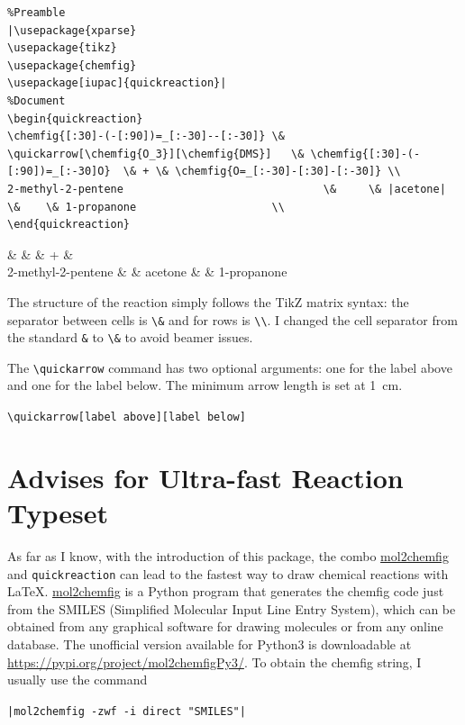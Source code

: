 \documentclass{scrarticle}
\begin{document}
\begin{lstlisting}
%Preamble
|\usepackage{xparse}
\usepackage{tikz}
\usepackage{chemfig}
\usepackage[iupac]{quickreaction}|
%Document
\begin{quickreaction}
\chemfig{[:30]-(-[:90])=_[:-30]--[:-30]} \&  \quickarrow[\chemfig{O_3}][\chemfig{DMS}]   \& \chemfig{[:30]-(-[:90])=_[:-30]O}  \& + \& \chemfig{O=_[:-30]-[:30]-[:-30]} \\
2-methyl-2-pentene                               \&     \& |acetone|                                       \&    \& 1-propanone                     \\
\end{quickreaction}
\end{lstlisting}

\begin{center}
\begin{quickreaction}
 \&     \&   \& + \&  \\
2-methyl-2-pentene                               \&     \& acetone                                      \&    \& 1-propanone                     \\
\end{quickreaction}
\end{center}

The structure of the reaction simply follows the TikZ matrix syntax: the separator between cells is \lstinline{\&} and for rows is \lstinline{\\}. I changed the cell separator from the standard \lstinline{&} to \lstinline{\&} to avoid beamer issues.

The \lstinline{\quickarrow} command has two optional arguments: one for the label above and one for the label below. The minimum arrow length is set at \qty{1}{\centi \m}. 
\begin{center}
\lstinline{\quickarrow[label above][label below]}
\end{center}
 

\section{Advises for Ultra-fast Reaction Typeset}

As far as I know, with the introduction of this package, the combo \href{https://www.ctan.org/pkg/mol2chemfig}{\ttfamily mol2chemfig} and \lstinline{quickreaction} can lead to the fastest way to draw chemical reactions with \LaTeX. \href{https://www.ctan.org/pkg/mol2chemfig}{\ttfamily mol2chemfig} is a Python program that generates the chemfig code just from the SMILES (Simplified Molecular Input Line Entry System), which can be obtained from any graphical software for drawing molecules or from any online database. The unofficial version available for Python3 is downloadable at \url{https://pypi.org/project/mol2chemfigPy3/}. To obtain the chemfig string, I usually use the command 
\begin{center}
\lstinline{|mol2chemfig -zwf -i direct "SMILES"|}
\end{center}
\end{document}
